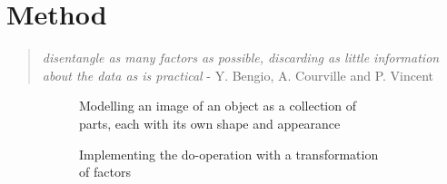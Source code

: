 \chapter{Method}

%
	\begin{quotation}
		\textit{disentangle as many factors as possible, discarding as little information about the data as is practical} - Y. Bengio, A. Courville and P. Vincent \cite{bengio}
	\end{quotation}

	\begin{figure}[t]
		\begin{subfigure}{0.49\linewidth}
			\centering
			
			\caption{Modelling an image of an object as a collection of parts, each with its own shape and appearance}
			\label{fig:s1}
		\end{subfigure}
		\begin{subfigure}{0.49\linewidth}
			\centering
			
			\caption{Implementing the do-operation with a transformation of factors}
			\label{fig:s2}
		\end{subfigure}
		\caption{}
		\label{fig:fig}
	\end{figure}


